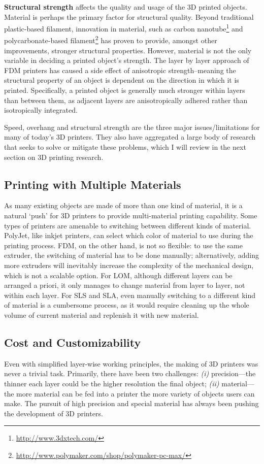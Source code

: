 \textbf{Structural strength} affects the quality and usage of the 3D printed objects. Material is perhaps the primary factor for structural quality. Beyond traditional plastic-based filament, innovation in material, such as carbon nanotube\footnote{\url{http://www.3dxtech.com/}} and polycarbonate-based filament\footnote{\url{http://www.polymaker.com/shop/polymaker-pc-max/}} has proven to provide, amongst other improvements, stronger structural properties. However, material is not the only variable in deciding a printed object's strength. The layer by layer approach of FDM printers has caused a side effect of anisotropic strength--meaning the structural property of an object is dependent on the direction in which it is printed. Specifically, a printed object is generally much stronger within layers than between them, as adjacent layers are anisotropically adhered rather than isotropically integrated. 

Speed, overhang and structural strength are the three major issues/limitations for many of today's 3D printers. They also have aggregated a large body of research that seeks to solve or mitigate these problems, which I will review in the next section on 3D printing research.

\subsection{Printing with Multiple Materials}
As many existing objects are made of more than one kind of material, it is a natural `push' for 3D printers to provide multi-material printing capability. Some types of printers are amenable to switching between different kinds of material. PolyJet, like inkjet printers, can select which color of material to use during the printing process. FDM, on the other hand, is not so flexible: to use the same extruder, the switching of material has to be done manually; alternatively, adding more extruders will inevitably increase the complexity of the mechanical design, which is not a scalable option. For LOM, although different layers can be arranged a priori, it only manages to change material from layer to layer, not within each layer. For SLS and SLA, even manually switching to a different kind of material is a cumbersome process, as it would require cleaning up the whole volume of current material and replenish it with new material.

\subsection{Cost and Customizability}
Even with simplified layer-wise working principles, the making of 3D printers was never a trivial task. Primarily, there have been two challenges: {\em (i)} precision---the thinner each layer could be the higher resolution the final object; {\em (ii)} material---the more material can be fed into a printer the more variety of objects users can make. The pursuit of high precision and special material has always been pushing the development of 3D printers.

